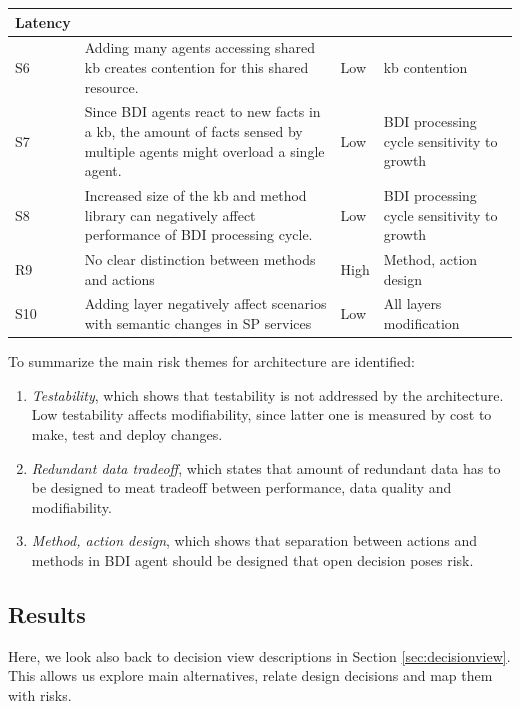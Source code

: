 \documentclass{llncs}
\begin{document}
\begin{table}
\begin{center}
\begin{tabular}{  l | p{23em} | l | p{6em} }
			Latency
				\\ \hline			
			S6 &
			Adding many agents accessing shared \gls{kb} creates contention for this shared resource. 
			& Low &
			\gls{kb} contention
			\\ \hline
			S7 &
			Since \gls{BDI} agents react to new facts in a \gls{kb}, the amount of facts sensed by multiple agents might overload a single agent.  
			& Low &
			\gls{BDI} processing cycle sensitivity to growth
			\\ \hline
			S8 & 
			Increased size of the \gls{kb} and method library can negatively affect performance of \gls{BDI} processing cycle.  & Low &
			\gls{BDI} processing cycle sensitivity to growth
			\\ \hline
			R9 &
			No clear distinction between methods and actions  & High &
			Method, action design			
			\\ \hline
			S10 &
			Adding layer negatively affect scenarios with semantic changes in \gls{SP} services   & Low &
All layers modification
			\\ \hline
						
			
		\end{tabular}
	\end{center}
\end{table}

To summarize the main risk themes for architecture are identified:
\begin{enumerate}
	\item \emph{Testability}, which shows that testability is not addressed by the architecture. Low testability affects modifiability, since latter one is measured by cost to make, test and deploy changes. 
	\item \emph{Redundant data tradeoff}, which states that amount of redundant data has to be designed to meat tradeoff between performance, data quality and modifiability.
	\item \emph{Method, action design}, which shows that separation between actions and methods in \gls{BDI} agent should be designed that open decision poses risk. 
\end{enumerate}



\subsection{Results}
\label{sec:architecture-results}
Here, we look also back to decision view descriptions in Section \ref{sec:decisionview}. This allows us explore main alternatives, relate design decisions and map them with risks.
\end{document}
